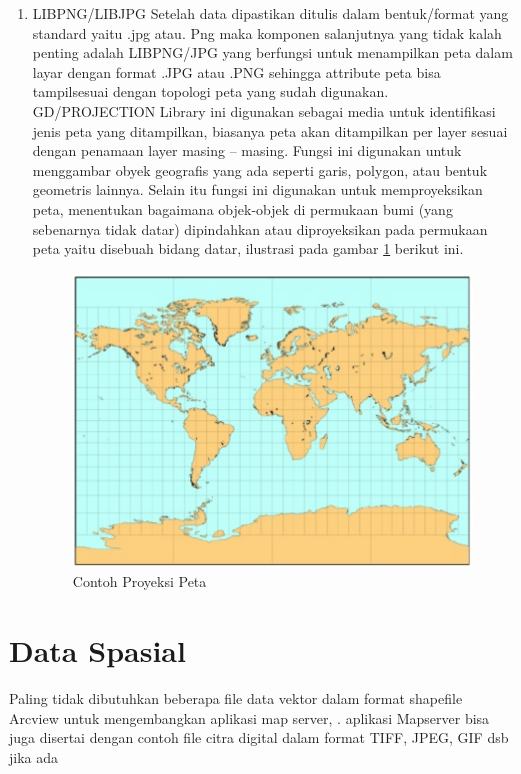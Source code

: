 \begin{enumerate}
\item LIBPNG/LIBJPG
\subitem Setelah data dipastikan ditulis dalam bentuk/format yang standard yaitu .jpg atau. Png maka komponen salanjutnya yang tidak kalah penting adalah LIBPNG/JPG yang berfungsi untuk menampilkan peta dalam layar dengan format .JPG atau .PNG sehingga attribute peta bisa tampilsesuai dengan topologi peta yang sudah digunakan.
GD/PROJECTION Library ini digunakan sebagai media untuk identifikasi jenis peta yang ditampilkan, biasanya peta akan ditampilkan per layer sesuai dengan penamaan layer masing –  masing. 
Fungsi ini digunakan untuk menggambar obyek geografis yang ada seperti garis, polygon, atau bentuk geometris lainnya. Selain itu fungsi ini digunakan untuk memproyeksikan peta, menentukan bagaimana objek-objek di permukaan bumi (yang sebenarnya tidak datar) dipindahkan atau diproyeksikan pada permukaan peta yaitu disebuah bidang datar, ilustrasi pada gambar \ref{Contoh Proyeksi Peta} berikut ini.
\begin{figure}[ht]
\centering
\includegraphics[width=1\textwidth]{pictures/contoh_proyeksi_peta}
\caption{Contoh Proyeksi Peta}
\label{Contoh Proyeksi Peta}
\end{figure}
\end{enumerate}

\section{Data Spasial}
Paling tidak dibutuhkan beberapa file data vektor dalam format shapefile Arcview untuk mengembangkan aplikasi map server, . aplikasi Mapserver bisa juga disertai dengan contoh file citra digital dalam format TIFF, JPEG, GIF dsb jika ada

